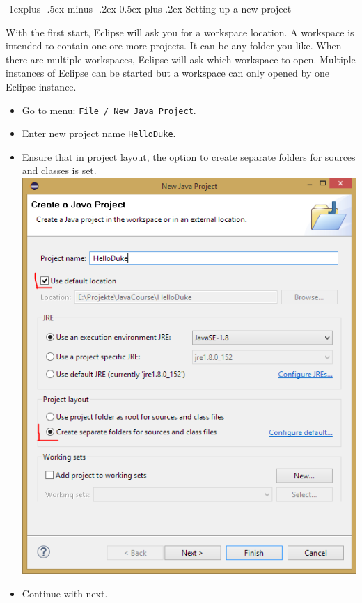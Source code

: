 \documentclass[10pt,landscape,a4paper]{article}
\makeatletter
\renewcommand{\subsection}{\@startsection{subsection}{2}{0mm}%
                                {-1explus -.5ex minus -.2ex}%
                                {0.5ex plus .2ex}%
                                {\normalfont\normalsize\bfseries}}
\makeatother
\begin{document}
\begin{multicols}{2}
\subsection{Setting up a new project}
\begin{multicols}{2}
With the first start, Eclipse will ask you for a workspace location. A workspace is intended to contain one ore more projects. It can be any folder you like. When there are multiple workspaces, Eclipse will ask which workspace to open. Multiple instances of Eclipse can be started but a workspace can only opened by one Eclipse instance.\\
\begin{itemize}
\item Go to menu: \texttt{File / New Java Project}.
\item Enter new project name \texttt{HelloDuke}.
\item Ensure that in project layout, the option to create separate folders for sources and classes is set. \includegraphics[width=.9\linewidth]{../slides/EclipseProjectWizard1.png}\\
\item Continue with next.

\end{itemize}
\end{multicols}
\end{multicols}
\end{document}
